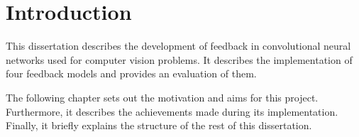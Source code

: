 \documentclass{l4proj}
\begin{document}
\tableofcontents

%
%
%

%
%
%
%
\chapter{Introduction}
\label{chap:intro}
This dissertation describes the development of feedback in convolutional neural networks used for computer vision problems. It describes the implementation of four feedback models and provides an evaluation of them. 

The following chapter sets out the motivation and aims for this project. Furthermore, it describes the achievements made during its implementation. Finally, it briefly explains the structure of the rest of this dissertation.
\end{document}

